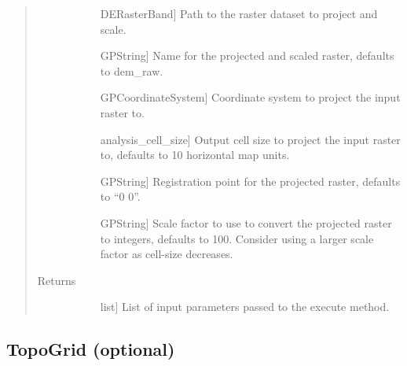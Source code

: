 \documentclass[letterpaper,10pt,english]{sphinxmanual}
\begin{document}
\begin{fulllineitems}
\begin{fulllineitems}
\begin{quote}
\begin{description}
\begin{description}
\item[{}] \leavevmode{[}DERasterBand{]}
Path to the raster dataset to project and scale.

\item[{}] \leavevmode{[}GPString{]}
Name for the projected and scaled raster, defaults to dem\_raw.

\item[{}] \leavevmode{[}GPCoordinateSystem{]}
Coordinate system to project the input raster to.

\item[{}] \leavevmode{[}analysis\_cell\_size{]}
Output cell size to project the input raster to, defaults to 10 horizontal map units.

\item[{}] \leavevmode{[}GPString{]}
Registration point for the projected raster, defaults to “0 0”.

\item[{}] \leavevmode{[}GPString{]}
Scale factor to use to convert the projected raster to integers, defaults to 100. Consider using a larger scale factor as cell-size decreases.

\end{description}

\item[{Returns}] \leavevmode\begin{description}
\item[{}] \leavevmode{[}list{]}
List of input parameters passed to the execute method.

\end{description}

\end{description}\end{quote}

\end{fulllineitems}


\end{fulllineitems}



\subsection{TopoGrid (optional)}
\label{\detokenize{StreamStats_DataPrep:topogrid-optional}}
\end{document}
